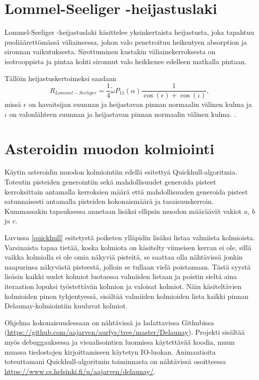 \documentclass[12pt,a4paper,titlepage]{article}
\begin{document}
\section{Lommel-Seeliger -heijastuslaki}
Lommel-Seeliger -heijastuslaki käsittelee yksinkertaista heijastusta, joka tapahtuu puoliäärettömässä väliaineessa, johon valo penetroituu heikentyen absorption ja sironnan vaikutuksesta. Sirottuminen kustakin väliainekerroksesta on isotrooppista ja pintaa kohti sironnut valo heikkenee edelleen matkalla pintaan. \cite{lommel}

Tällöin heijastuskertoimeksi saadaan
\begin{equation}\label{lommel-seeliger}
	R_{Lommel-Seeliger} = \frac{1}{4}\widetilde{\omega}P_{11}(\alpha)\frac{1}{\cos(\epsilon)+\cos(\iota)},
\end{equation}
missä $\epsilon$ on havaitsijan suunnan ja heijastavan pinnan normaalin välinen kulma ja $\iota$ on valonlähteen suunnan ja heijastavan pinnan normaalin välinen kulma. \cite{tenttimatsku, lommel}.

\section{Asteroidin muodon kolmiointi}
Käytin asteroidin muodon kolmiointiin edellä esitettyä Quickhull-algoritmia. Toteutin pisteiden generointiin sekä mahdollisuudet generoida pisteet kerroksittain antamalla kerroksien määrä että mahdollisuuden generoida pisteet satunnaisesti antamalla pisteiden kokonaismäärä ja tasaisuuskerroin. Kummassakin tapauksessa annetaan lisäksi ellipsin muodon määräävät vakiot $a$, $b$ ja $c$.

Luvussa \ref{quickhull} esitetystä poiketen ylläpidin lisäksi listaa valmiista kolmioista. Varsinaista tapaa tietää, koska kolmiota on käsitelty viimeisen kerran ei ole, sillä vaikka kolmiolla ei ole omia näkyviä pisteitä, se saattaa olla nähtävissä jonkin naapurinsa näkyvästä pisteestä, jolloin se tullaan vielä poistamaan. Tästä syystä lisäsin kaikki uudet kolmiot luotaessa valmiiden listaan ja poistin sieltä aina iteraation lopuksi työstettävän kolmion ja valoisat kolmiot. Näin käsiteltävien kolmioiden pinon tyhjentyessä, sisältää valmiiden kolmioiden lista kaikki pinnan Delaunay-kolmiointiin kuuluvat kolmiot.

Ohjelma kokonaisuudessaan on nähtävissä ja ladattavissa Githubissa (\url{https://github.com/aajarven/aurfys/tree/master/Delaunay}). Projekti sisältää myös debuggauksessa ja visualisointien luonnissa käytettävää koodia, muun muassa tiedostojen kirjoittamiseen käytetyn IO-luokan. Animaatioita toteuttamani Quickhull-algoritmin toiminnasta on nähtävissä osoitteessa \url{https://www.cs.helsinki.fi/u/aajarven/delaunay/}.
\end{document}
